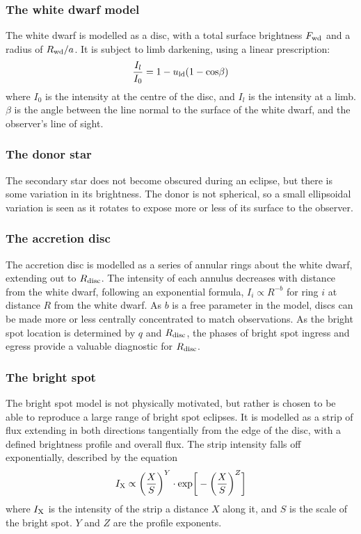 \subsubsection{The white dwarf model}

The white dwarf is modelled as a disc, with a total surface brightness $F_{\rm wd}$ and a radius of $R_{\rm wd} / a$. It is subject to limb darkening, using a linear prescription:
\begin{equation}
    \frac{I_l}{I_0} = 1 - u_{\rm ld}(1 - {\rm cos}\beta)
\end{equation}
where $I_0$ is the intensity at the centre of the disc, and $I_l$ is the intensity at a limb. $\beta$ is the angle between the line normal to the surface of the white dwarf, and the observer's line of sight. 

\subsubsection{The donor star}
The secondary star does not become obscured during an eclipse, but there is some variation in its brightness. The donor is not spherical, so a small ellipsoidal variation is seen as it rotates to expose more or less of its surface to the observer.

\subsubsection{The accretion disc}
The accretion disc is modelled as a series of annular rings about the white dwarf, extending out to $R_{\rm disc}$. The intensity of each annulus decreases with distance from the white dwarf, following an exponential formula, $I_i \propto R^{-b}$ for ring $i$ at distance $R$ from the white dwarf. As $b$ is a free parameter in the model, discs can be made more or less centrally concentrated to match observations. As the bright spot location is determined by $q$ and $R_{\rm disc}$, the phases of bright spot ingress and egress provide a valuable diagnostic for $R_{\rm disc}$.

\subsubsection{The bright spot}
The bright spot model is not physically motivated, but rather is chosen to be able to reproduce a large range of bright spot eclipses. 
It is modelled as a strip of flux extending in both directions tangentially from the edge of the disc, with a defined brightness profile and overall flux. The strip intensity falls off exponentially, described by the equation
\begin{equation}
    I_{\rm X} \propto \bigg ( \frac{X}{S} \bigg )^Y \cdot {\rm exp} \bigg [ - \bigg (\frac{X}{S} \bigg )^Z \bigg]    
\end{equation}
where $I_{\rm X}$ is the intensity of the strip a distance $X$ along it, and $S$ is the scale of the bright spot. $Y$ and $Z$ are the profile exponents. 

